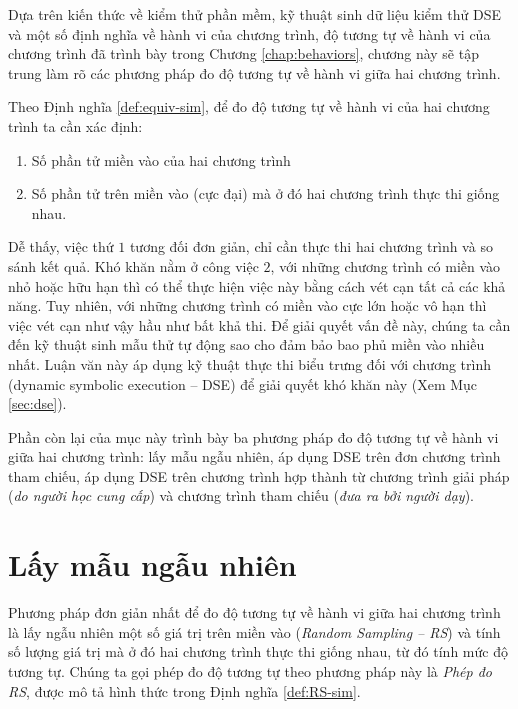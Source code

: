 Dựa trên kiến thức về kiểm thử phần mềm, kỹ thuật 
sinh dữ liệu kiểm thử DSE và một số định nghĩa về hành vi của chương trình, 
độ tương tự về hành vi của chương trình đã trình bày trong Chương 
\ref{chap:behaviors}, chương này sẽ tập trung làm rõ các phương pháp 
đo độ tương tự về hành vi giữa hai chương trình.   


Theo Định nghĩa \ref{def:equiv-sim}, để đo độ tương tự về hành vi của
hai chương trình ta cần xác định:
\begin{enumerate}
\item Số phần tử miền vào của hai chương trình
\item Số phần tử trên miền vào (cực đại) mà ở đó hai chương trình thực thi giống nhau.
\end{enumerate}
Dễ thấy, việc thứ $1$ tương đối đơn giản, chỉ cần thực thi hai
chương trình và so sánh kết quả. Khó khăn nằm ở công việc $2$, với
những chương trình có miền vào nhỏ hoặc hữu hạn thì có thể thực hiện
việc này bằng cách vét cạn tất cả các khả năng. Tuy nhiên, với những
chương trình có miền vào cực lớn hoặc vô hạn thì việc vét cạn như vậy
hầu như bất khả thi. Để giải quyết vấn đề này, chúng ta cần đến kỹ
thuật sinh mẫu thử tự động sao cho đảm bảo bao phủ miền vào nhiều
nhất. Luận văn này áp dụng kỹ thuật thực thi biểu trưng đối với chương
trình (dynamic symbolic execution -- DSE) để giải quyết khó khăn này
(Xem Mục \ref{sec:dse}).

Phần còn lại của mục này trình bày ba phương pháp đo độ tương tự về
hành vi giữa hai chương trình: lấy mẫu ngẫu nhiên, áp dụng DSE trên
đơn chương trình tham chiếu, áp dụng DSE trên chương trình hợp thành
từ chương trình giải pháp (\emph{do người học cung cấp}) và chương
trình tham chiếu (\emph{đưa ra bởi người dạy}).

\section{Lấy mẫu ngẫu nhiên}

Phương pháp đơn giản nhất để đo độ tương tự về hành vi giữa hai chương
trình là lấy ngẫu nhiên một số giá trị trên miền vào (\emph{Random
  Sampling -- RS}) và tính số lượng giá trị mà ở đó hai chương trình
thực thi giống nhau, từ đó tính mức độ tương tự. Chúng ta gọi phép đo
độ tương tự theo phương pháp này là \emph{Phép đo RS}, được mô tả hình thức
trong Định nghĩa \ref{def:RS-sim}.

